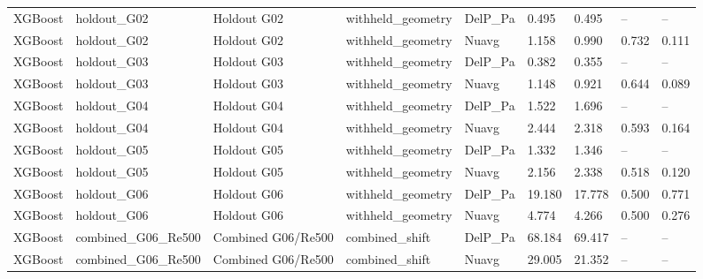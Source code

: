 \begin{tabular}{lllllllll}
XGBoost & holdout_G02 & Holdout G02 & withheld_geometry & DelP_Pa & 0.495 & 0.495 & -- & -- \\
XGBoost & holdout_G02 & Holdout G02 & withheld_geometry & Nuavg & 1.158 & 0.990 & 0.732 & 0.111 \\
XGBoost & holdout_G03 & Holdout G03 & withheld_geometry & DelP_Pa & 0.382 & 0.355 & -- & -- \\
XGBoost & holdout_G03 & Holdout G03 & withheld_geometry & Nuavg & 1.148 & 0.921 & 0.644 & 0.089 \\
XGBoost & holdout_G04 & Holdout G04 & withheld_geometry & DelP_Pa & 1.522 & 1.696 & -- & -- \\
XGBoost & holdout_G04 & Holdout G04 & withheld_geometry & Nuavg & 2.444 & 2.318 & 0.593 & 0.164 \\
XGBoost & holdout_G05 & Holdout G05 & withheld_geometry & DelP_Pa & 1.332 & 1.346 & -- & -- \\
XGBoost & holdout_G05 & Holdout G05 & withheld_geometry & Nuavg & 2.156 & 2.338 & 0.518 & 0.120 \\
XGBoost & holdout_G06 & Holdout G06 & withheld_geometry & DelP_Pa & 19.180 & 17.778 & 0.500 & 0.771 \\
XGBoost & holdout_G06 & Holdout G06 & withheld_geometry & Nuavg & 4.774 & 4.266 & 0.500 & 0.276 \\
XGBoost & combined_G06_Re500 & Combined G06/Re500 & combined_shift & DelP_Pa & 68.184 & 69.417 & -- & -- \\
XGBoost & combined_G06_Re500 & Combined G06/Re500 & combined_shift & Nuavg & 29.005 & 21.352 & -- & -- \\
\hline
\end{tabular}
